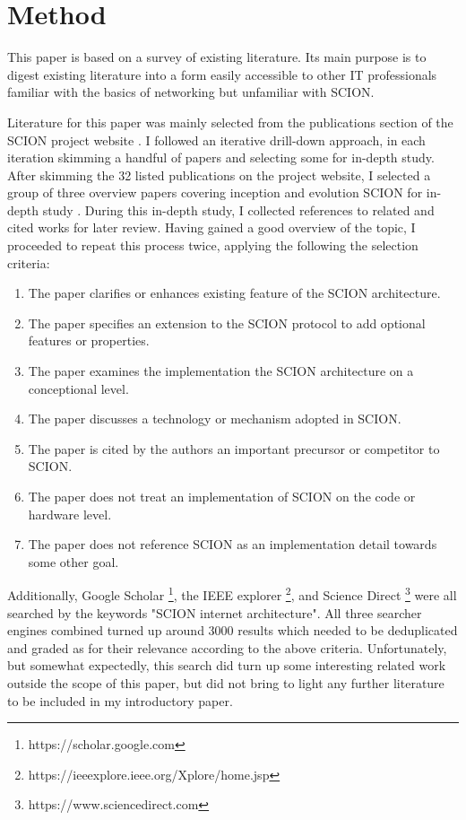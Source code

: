 \documentclass[../eva1_scion.tex]{subfiles}
\begin{document}
\section{Method}\label{sec:method}


    This paper is based on a survey of existing literature. Its main purpose is to digest existing literature into a form easily accessible to other IT professionals familiar with the basics of networking but unfamiliar with SCION.

       Literature for this paper was mainly selected from the publications section of the SCION project website \cite{scion_website}. I followed an iterative drill-down approach, in each iteration skimming a handful of papers and selecting some for in-depth study. After skimming the 32 listed publications on the project website, I selected a group of three overview papers covering inception and evolution SCION for in-depth study \cite{scion_2011, scion_2015, scion_2017}. During this in-depth study, I collected references to related and cited works for later review. Having gained a good overview of the topic, I proceeded to repeat this process twice, applying the following the selection criteria:

    \begin{enumerate}
        \item The paper clarifies or enhances existing feature of the SCION architecture.
        \item The paper specifies an extension to the SCION protocol to add optional features or properties.
        \item The paper examines the implementation the SCION architecture on a conceptional level.
        \item The paper discusses a technology or mechanism adopted in SCION.
        \item The paper is cited by the authors an important precursor or competitor to SCION.
        \item The paper does not treat an implementation of SCION on the code or hardware level.
        \item The paper does not reference SCION as an implementation detail towards some other goal.
    \end{enumerate}

    Additionally, Google Scholar \footnote{https://scholar.google.com}, the IEEE explorer \footnote{https://ieeexplore.ieee.org/Xplore/home.jsp}, and Science Direct \footnote{https://www.sciencedirect.com} were all searched by the keywords "SCION internet architecture". All three searcher engines combined turned up around 3000 results which needed to be deduplicated and graded as for their relevance according to the above criteria. Unfortunately, but somewhat expectedly, this search did turn up some interesting related work outside the scope of this paper, but did not bring to light any further literature to be included in my introductory paper.
\end{document}
